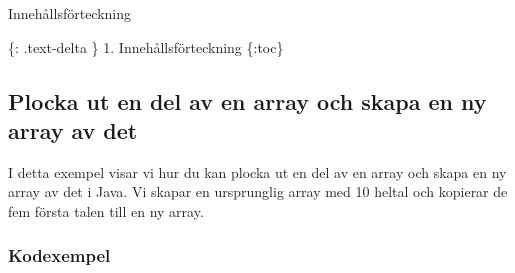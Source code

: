 Innehållsförteckning

\{: .text-delta \} 1. Innehållsförteckning \{:toc\}

\hypertarget{plocka-ut-en-del-av-en-array-och-skapa-en-ny-array-av-det}{%
\subsection{Plocka ut en del av en array och skapa en ny array av
det}\label{plocka-ut-en-del-av-en-array-och-skapa-en-ny-array-av-det}}

I detta exempel visar vi hur du kan plocka ut en del av en array och
skapa en ny array av det i Java. Vi skapar en ursprunglig array med 10
heltal och kopierar de fem första talen till en ny array.

\hypertarget{kodexempel}{%
\subsubsection{Kodexempel}\label{kodexempel}}

